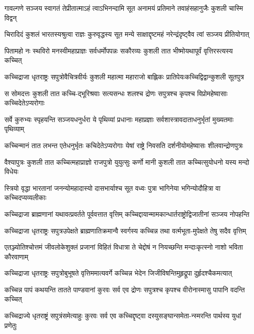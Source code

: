 \twolineshloka
{गावल्गणे सञ्जय स्वागतं तेप्रीतात्माऽहं त्वाऽभिनन्दामि सूत}
{अनामयं प्रतिमाने तवाहंसहानुजैः कुशली चास्मि विद्वन्}


\twolineshloka
{चिरादिदं कुशलं भारतस्यश्रुत्वा राज्ञः कुरुवृद्धस्य सूत}
{मन्ये साक्षाद्दृष्टमहं नरेन्द्रंदृष्ट्वैव त्वां सञ्जय प्रीतियोगात्}


\twolineshloka
{पितामहो नः स्थविरो मनस्वीमहाप्राज्ञः सर्वधर्मोपपन्नः}
{सकौरव्यः कुशली तात भीष्मोयथापूर्वं वृत्तिरस्त्यस्य कच्चित्}


\twolineshloka
{कच्चिद्राजा धृतराष्ट्रः सपुत्रोवैचित्रवीर्यः कुशली महात्मा}
{महाराजो बाह्लिकः प्रातिपेयःकच्चिद्विद्वान्कुशली सूतपुत्र}


\twolineshloka
{स सोमदत्तः कुशली तात कच्चि-द्भूरिश्रवाः सत्यसन्धः शलश्च}
{द्रोणः सपुत्रश्च कृपश्च विप्रोमहेष्वासाः कच्चिदेतेऽप्यरोगाः}


\twolineshloka
{सर्वे कुरुभ्यः स्पृहयन्ति सञ्जयधनुर्धरा ये पृथिव्यां प्रधानाः}
{महाप्रज्ञाः सर्वशास्त्रावदाताधनुर्भृतां मुख्यतमाः पृथिव्याम्}


\twolineshloka
{कच्चिन्मानं तात लभन्त एतेधनुर्भृतः कचिदेतेऽप्यरोगाः}
{येषां राष्ट्रे निवसति दर्शनीयोमहेष्वासः शीलवान्द्रोणपुत्रः}


\twolineshloka
{वैश्यापुत्रः कुशली तात कच्चित्महाप्राज्ञो राजपुत्रो युयुत्सुः}
{कर्णो मानी कुशली तात कच्चित्सुयोधनो यस्य मन्दो विधेयः}


\twolineshloka
{स्त्रियो वृद्धा भारतानां जनन्योमहादास्यो दासभार्याश्च सूत}
{वध्वः पुत्रा भागिनेया भगिन्योदौहित्रा वा कच्चिदप्यव्यलीकाः}


\twolineshloka
{कच्चिद्राजा ब्राह्मणानां यथावत्प्रवर्तते पूर्ववत्तात वृत्तिम्}
{कच्चिद्दायान्मामकान्धार्तराष्ट्रोद्विजातीनां सञ्जय नोपहन्ति}


\twolineshloka
{कच्चिद्राजा धृतराष्ट्रः सपुत्रउपेक्षते ब्राह्मणातिक्रमान्वै}
{स्वर्गस्य कच्चिन्न तथा वर्त्मभूता-मुपेक्षते तेषु सदैव वृत्तिम्}


\twolineshloka
{एतञ्ज्योतिश्चोत्तमं जीवलोकेशुक्लं प्रजानां विहितं विधात्रा}
{ते चेद्दोषं न नियच्छन्ति मन्दाःकृत्स्नो नाशो भविता कौरवाणाम्}


\twolineshloka
{कच्चिद्राजा धृतराष्ट्रः सपुत्रोबुभूषते वृत्तिममात्यवर्गे}
{कच्चिन्न भेदेन जिजीविषन्तिमुहृद्रूपा दुर्हृदश्चैकमत्यात्}


\twolineshloka
{कच्चिन्न पापं कथयन्ति तातते पाण्डवानां कुरवः सर्व एव}
{द्रोणः सपुत्रश्च कृपश्च वीरोनास्मासु पापानि वदन्ति कच्चित्}


\twolineshloka
{कच्चिद्राज्ये धृतराष्ट्रं सपुत्रंसमेत्याहुः कुरवः सर्व एव}
{कच्चिद्दृष्ट्वा दस्युसङ्घान्समेता-न्स्मरन्ति पार्थस्य युधां प्रणेतुः}


